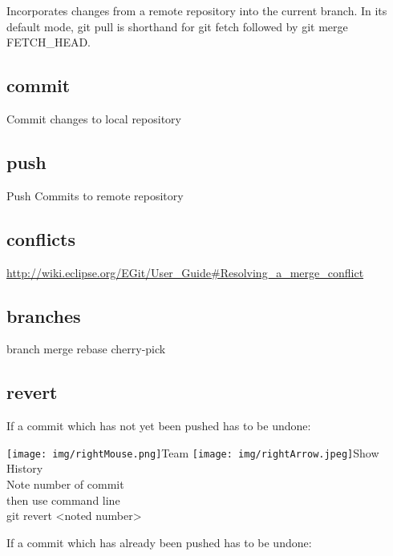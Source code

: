 \documentclass{scrreprt}
\newcommand{\rightMouse}{%
\texttt{[image: img/rightMouse.png]}}
\newcommand{\rightArrow}{%
\texttt{[image: img/rightArrow.jpeg]}\hspace{1mm}}
\newcommand{\layerThree}[1]{\subsection{#1}}
\begin{document}
Incorporates changes from a remote repository into the current branch. 
In its default mode, git pull is shorthand for git fetch followed by git merge FETCH_HEAD.

\layerThree{commit}

Commit changes to local repository

\layerThree{push}

Push Commits to remote repository

\layerThree{conflicts}

\url{http://wiki.eclipse.org/EGit/User_Guide#Resolving_a_merge_conflict}

\layerThree{branches}
branch
merge
rebase
cherry-pick

\layerThree{revert}

If a commit which has not yet been pushed has to be undone:

\rightMouse Team \rightArrow Show History \\
Note number of commit
\\ then use command line \\
{\ttfamily git revert <noted number>}

If a commit which has already been pushed has to be undone:



\nocite{*}

\clearpage
{}
{}


\end{document}
